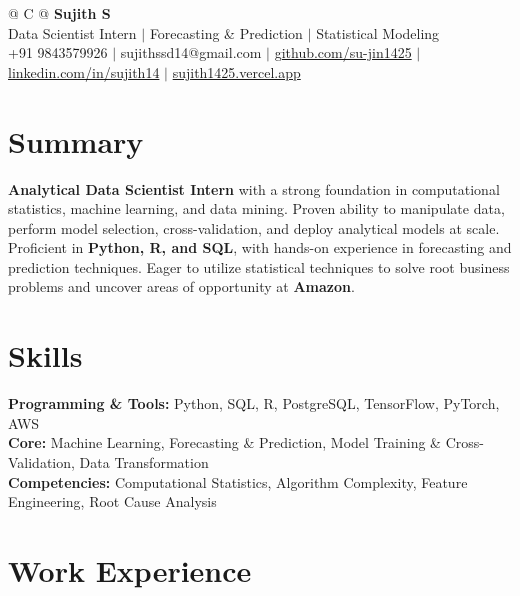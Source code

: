 \documentclass[a4paper,10pt]{article}
\newcommand{\ulink}[2]{\href{#1}{#2}}
\begin{document}
\pagestyle{empty}

\begin{tabularx}{\linewidth}{@{} C @{}}
{\color[HTML]{000000}\fontsize{30}{35}\selectfont\bfseries Sujith S} \\[5pt]
{\fontsize{10.5}{12.5}\selectfont\color[HTML]{3A3A3A}
Data Scientist Intern $|$ Forecasting \& Prediction $|$ Statistical Modeling} \\[6pt]
{\fontsize{9.5}{11.5}\selectfont\textcolor[HTML]{3A3A3A}{+91 9843579926 $|$ sujithssd14@gmail.com $|$ \ulink{https://github.com/su-jin1425}{github.com/su-jin1425} $|$ \ulink{https://linkedin.com/in/sujith14}{linkedin.com/in/sujith14} $|$ \ulink{https://sujith1425.vercel.app}{sujith1425.vercel.app}}}
\end{tabularx}

\section{Summary}
\vspace{2pt}

{\color[HTML]{0A0A0A}\fontsize{11}{14}\selectfont
\textbf{Analytical Data Scientist Intern} with a strong foundation in computational statistics, machine learning, and data mining. Proven ability to manipulate data, perform model selection, cross-validation, and deploy analytical models at scale. Proficient in \textbf{Python, R, and SQL}, with hands-on experience in forecasting and prediction techniques. Eager to utilize statistical techniques to solve root business problems and uncover areas of opportunity at \textbf{Amazon}.}

\section{Skills}
\vspace{2pt}

{\color[HTML]{0A0A0A}\fontsize{11}{14}\selectfont
\textbf{Programming \& Tools:} Python, SQL, R, PostgreSQL, TensorFlow, PyTorch, AWS \\[2pt]
\textbf{Core:} Machine Learning, Forecasting \& Prediction, Model Training \& Cross-Validation, Data Transformation \\[2pt]
\textbf{Competencies:} Computational Statistics, Algorithm Complexity, Feature Engineering, Root Cause Analysis}

\section{Work Experience}
\vspace{2pt}
\end{document}
